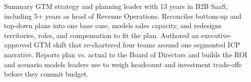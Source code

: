 \documentclass{resume}
\begin{document}
\vspace{-0.15cm}

\begin{rSection}{Summary}
GTM strategy and planning leader with 13 years in B2B SaaS, including 5+ years as head of Revenue Operations. Reconciles bottom-up and top-down plans into one base case, models sales capacity, and redesigns territories, roles, and compensation to fit the plan. Authored an executive-approved GTM shift that re-chartered four teams around one segmented ICP narrative. Reports plan vs. actual to the Board of Directors and builds the ROI and scenario models leaders use to weigh headcount and investment trade-offs before they commit budget.
\end{rSection}
\vspace{-0.15cm}
\end{document}
